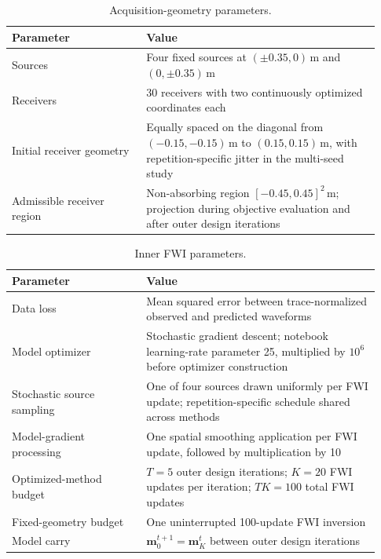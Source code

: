 \documentclass{article}
\newcommand{\vect}[1]{\boldsymbol{#1}}
\begin{document}
\begin{table}[!htbp]
  \centering
  \small
  \caption{Acquisition-geometry parameters.}
  \label{tab:acquisition-parameters}
  \begin{tabular}{@{}L{0.34\linewidth}L{0.59\linewidth}@{}}
    \toprule
    Parameter & Value \\
    \midrule
    Sources & Four fixed sources at $(\pm0.35,0)\,\mathrm{m}$ and $(0,\pm0.35)\,\mathrm{m}$ \\
    Receivers & 30 receivers with two continuously optimized coordinates each \\
    Initial receiver geometry & Equally spaced on the diagonal from $(-0.15,-0.15)\,\mathrm{m}$ to $(0.15,0.15)\,\mathrm{m}$, with repetition-specific jitter in the multi-seed study \\
    Admissible receiver region & Non-absorbing region $[-0.45,0.45]^2\,\mathrm{m}$; projection during objective evaluation and after outer design iterations \\
    \bottomrule
  \end{tabular}
\end{table}

\begin{table}[!htbp]
  \centering
  \small
  \caption{Inner FWI parameters.}
  \label{tab:fwi-parameters}
  \begin{tabular}{@{}L{0.34\linewidth}L{0.59\linewidth}@{}}
    \toprule
    Parameter & Value \\
    \midrule
    Data loss & Mean squared error between trace-normalized observed and predicted waveforms \\
    Model optimizer & Stochastic gradient descent; notebook learning-rate parameter 25, multiplied by $10^{6}$ before optimizer construction \\
    Stochastic source sampling & One of four sources drawn uniformly per FWI update; repetition-specific schedule shared across methods \\
    Model-gradient processing & One spatial smoothing application per FWI update, followed by multiplication by 10 \\
    Optimized-method budget & $T=5$ outer design iterations; $K=20$ FWI updates per iteration; $TK=100$ total FWI updates \\
    Fixed-geometry budget & One uninterrupted 100-update FWI inversion \\
    Model carry & $\vect{m}^{t+1}_0=\vect{m}^{t}_K$ between outer design iterations \\
    \bottomrule
  \end{tabular}
\end{table}
\end{document}
